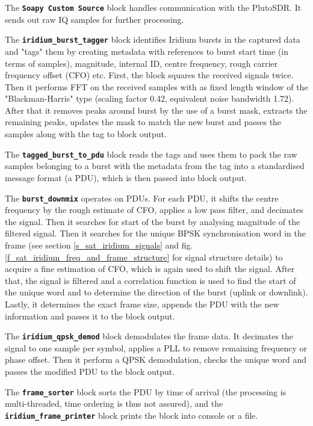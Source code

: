 The \textbf{\texttt{Soapy Custom Source}} block handles communication with the PlutoSDR. It sends out raw IQ samples for further processing.

The \textbf{\texttt{iridium\_burst\_tagger}} block identifies Iridium bursts in the captured data and "tags" them by creating metadata with references to burst start time (in terms of samples), magnitude, internal ID, centre frequency, rough carrier frequency offset (CFO) etc. First, the block squares the received signals twice. Then it performs FFT on the received samples with as fixed length window of the "Blackman-Harris" type (scaling factor \num{0.42}, equivalent noise bandwidth \num{1.72})\cite{des08}. After that it removes peaks around burst by the use of a burst mask, extracts the remaining peaks, updates the mask to match the new burst and passes the samples along with the tag to block output.

The \textbf{\texttt{tagged\_burst\_to\_pdu}} block reads the tags and uses them to pack the raw samples belonging to a burst with the metadata from the tag into a standardised message format (a PDU), which is then passed into block output.

The \textbf{\texttt{burst\_downmix}} operates on PDUs. For each PDU, it shifts the centre frequency by the rough estimate of CFO, applies a low pass filter, and decimates the signal. Then it searches for start of the burst by analysing magnitude of the filtered signal. Then it searches for the unique BPSK synchronisation word in the frame (see section \ref{s_sat_iridium_signals} and fig. \ref{f_sat_iridium_freq_and_frame_structure} for signal structure details) to acquire a fine estimation of CFO, which is again used to shift the signal. After that, the signal is filtered and a correlation function is used to find the start of the unique word and to determine the direction of the burst (uplink or downlink). Lastly, it determines the exact frame size, appends the PDU with the new information and passes it to the block output.

The \textbf{\texttt{iridium\_qpsk\_demod}} block demodulates the frame data. It decimates the signal to one sample per symbol, applies a PLL to remove remaining frequency or phase offset. Then it perform a QPSK demodulation, checks the unique word and passes the modified PDU to the block output.

The \textbf{\texttt{frame\_sorter}} block sorts the PDU by time of arrival (the processing is multi-threaded, time ordering is thus not assured), and the \textbf{\texttt{iridium\_frame\_printer}} block prints the block into console or a file.


